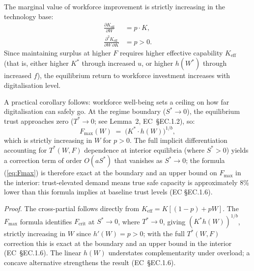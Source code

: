 \documentclass[msom,dblanonrev]{informs4}
\newcommand{\Keff}{K_{\mathrm{eff}}}
\begin{document}
\setcounter{proposition}{3}
\begin{proposition}\label{prop:complementarity}
The marginal value of workforce improvement is strictly increasing in the technology base:
\begin{equation}\label{eq:complementarity}
\begin{aligned}
    \frac{\partial \Keff}{\partial W} &= p \cdot K, \\[4pt]
    \frac{\partial^2 \Keff}{\partial W\,\partial K} &= p > 0.
\end{aligned}
\end{equation}
Since maintaining surplus at higher $F$ requires higher effective capability $\Keff$ (that is, either higher $K^*$ through increased $u$, or higher $h(W^*)$ through increased $f$), the equilibrium return to workforce investment increases with digitalisation level.

A practical corollary follows: workforce well-being sets a ceiling on how far digitalisation can safely go. At the regime boundary ($S^* \to 0$), the equilibrium trust approaches zero ($T^* \to 0$; see Lemma~2, EC~\S EC.1.2), so:
\begin{equation}\label{eq:Fmax}
    F_{\max}(W) \;=\; \bigl(K^* \cdot h(W)\bigr)^{1/b},
\end{equation}
which is strictly increasing in $W$ for $p > 0$. The full implicit differentiation accounting for $T^*(W,F)$ dependence at interior equilibria (where $S^* > 0$) yields a correction term of order $O(aS^*)$ that vanishes as $S^* \to 0$; the formula (\ref{eq:Fmax}) is therefore exact at the boundary and an upper bound on $F_{\max}$ in the interior: trust-elevated demand means true safe capacity is approximately 8\% lower than this formula implies at baseline trust levels (EC \S EC.1.6).
\end{proposition}

\noindent\textit{Proof.} The cross-partial follows directly from $\Keff = K[(1-p)+pW]$. The $F_{\max}$ formula identifies $F_{\mathrm{crit}}$ at $S^*\to 0$, where $T^*\to 0$, giving $(K^*h(W))^{1/b}$, strictly increasing in $W$ since $h'(W)=p>0$; with the full $T^*(W,F)$ correction this is exact at the boundary and an upper bound in the interior (EC~\S EC.1.6). The linear $h(W)$ understates complementarity under overload; a concave alternative strengthens the result (EC~\S EC.1.6). \Halmos
\end{document}
